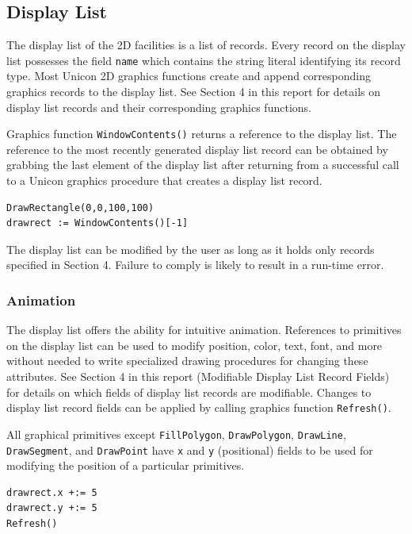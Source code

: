\documentclass[letterpaper,12pt]{article}
\begin{document}
\subsection{Display List}

The display list of the 2D facilities is a list of records. Every record 
on the display list possesses the field \texttt{name} which contains the
string literal identifying its record type. Most Unicon 2D graphics functions
create and append corresponding graphics records to the display list.
See Section 4 in this report for details on display list records and their 
corresponding graphics functions.

Graphics function \texttt{WindowContents()} returns a reference to the
display list.  The reference to the most recently generated display
list record can be obtained by grabbing the last element of the
display list after returning from a successful call to a Unicon
graphics procedure that creates a display list record.

\begin{verbatim}
DrawRectangle(0,0,100,100)
drawrect := WindowContents()[-1]
\end{verbatim}

The display list can be modified by the user as long as it holds only 
records specified in Section 4. Failure to comply is likely
to result in a run-time error.

\subsubsection{Animation}

The display list offers the ability for intuitive animation.
References to primitives on the display list can be used to modify
position, color, text, font, and more without needed to write specialized
drawing procedures for changing these attributes. 
See Section 4 in this report (Modifiable Display List Record Fields)
for details on which fields of display list records are modifiable.
Changes to display list
record fields can be applied by calling graphics function \texttt{Refresh()}.

All graphical primitives except 
\texttt{FillPolygon}, \texttt{DrawPolygon}, \texttt{DrawLine}, \\
\texttt{DrawSegment}, and \texttt{DrawPoint} have 
\texttt{x} and \texttt{y} (positional) fields to be used for modifying the 
position of a particular primitives.

\newpage %
\begin{verbatim}
drawrect.x +:= 5
drawrect.y +:= 5 
Refresh()
\end{verbatim}
\end{document}
